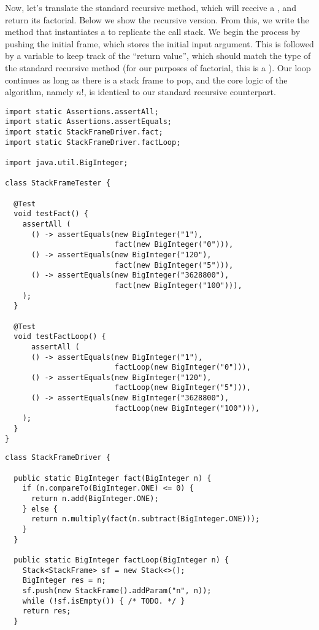 Now, let's translate the standard recursive  method, which will receive a , and return its factorial. Below we show the recursive version. From this, we write the  method that instantiates a  to replicate the call stack. We begin the process by pushing the initial frame, which stores the initial input argument. This is followed by a variable to keep track of the ``return value'', which should match the type of the standard recursive method (for our purposes of factorial, this is a ). Our loop continues as long as there is a stack frame to pop, and the core logic of the algorithm, namely $n!$, is identical to our standard recursive counterpart.

\begin{cl}{}
\begin{lstlisting}[language=MyJava]
import static Assertions.assertAll;
import static Assertions.assertEquals;
import static StackFrameDriver.fact;
import static StackFrameDriver.factLoop;

import java.util.BigInteger;

class StackFrameTester {

  @Test
  void testFact() {
    assertAll (
      () -> assertEquals(new BigInteger("1"), 
                         fact(new BigInteger("0"))),
      () -> assertEquals(new BigInteger("120"), 
                         fact(new BigInteger("5"))),
      () -> assertEquals(new BigInteger("3628800"), 
                         fact(new BigInteger("100"))),
    );
  }

  @Test
  void testFactLoop() {
      assertAll (
      () -> assertEquals(new BigInteger("1"), 
                         factLoop(new BigInteger("0"))),
      () -> assertEquals(new BigInteger("120"), 
                         factLoop(new BigInteger("5"))),
      () -> assertEquals(new BigInteger("3628800"), 
                         factLoop(new BigInteger("100"))),
    );
  }
}  
\end{lstlisting}
\end{cl}

\begin{cl}{}
\begin{lstlisting}[language=MyJava]
class StackFrameDriver {

  public static BigInteger fact(BigInteger n) {
    if (n.compareTo(BigInteger.ONE) <= 0) {
      return n.add(BigInteger.ONE);
    } else {
      return n.multiply(fact(n.subtract(BigInteger.ONE)));
    }
  }

  public static BigInteger factLoop(BigInteger n) {
    Stack<StackFrame> sf = new Stack<>();
    BigInteger res = n;
    sf.push(new StackFrame().addParam("n", n));
    while (!sf.isEmpty()) { /* TODO. */ }
    return res;
  }
\end{lstlisting}
\end{cl}

